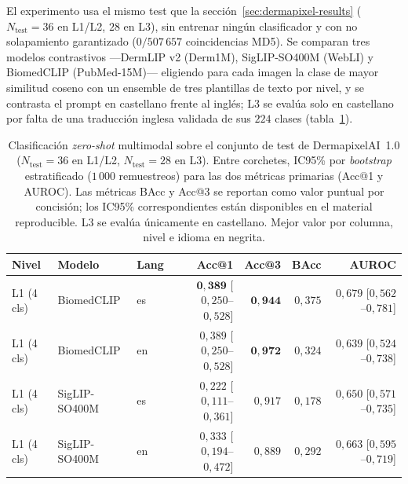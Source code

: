 El experimento usa el mismo test que la
sección~\ref{sec:dermapixel-results} ($N_{\mathrm{test}} = 36$ en
L1/L2, $28$ en L3), sin entrenar ningún clasificador y con no
solapamiento garantizado ($0 / 507\,657$ coincidencias MD5). Se
comparan tres modelos contrastivos ---DermLIP v2 (Derm1M),
SigLIP-SO400M (WebLI) y BiomedCLIP (PubMed-15M)--- eligiendo para cada
imagen la clase de mayor similitud coseno con un ensemble de
tres plantillas de texto por nivel, y se contrasta el prompt en
castellano frente al inglés; L3 se evalúa solo en castellano por falta
de una traducción inglesa validada de sus $224$ clases
(tabla~\ref{tab:dermapixel-zs}).

\begin{table}[htbp]
\centering
\footnotesize
\setlength{\tabcolsep}{4pt}
\renewcommand{\arraystretch}{0.95}
\caption{Clasificación \emph{zero-shot} multimodal sobre el
conjunto de test de DermapixelAI~1.0 ($N_{\mathrm{test}} = 36$ en
L1/L2, $N_{\mathrm{test}} = 28$ en L3). Entre corchetes, IC95\%
por \emph{bootstrap} estratificado ($1\,000$ remuestreos) para
las dos métricas primarias (Acc@1 y AUROC). Las métricas BAcc y
Acc@3 se reportan como valor puntual por concisión; los IC95\%
correspondientes están disponibles en el material reproducible.
L3 se evalúa únicamente en castellano. Mejor valor por columna,
nivel e idioma en negrita.}
\label{tab:dermapixel-zs}
\begin{tabular}{lllrrrr}
\hline
Nivel & Modelo & Lang & Acc@1 & Acc@3 & BAcc & AUROC \\
\hline
L1 (4 cls)   & BiomedCLIP    & es & $\mathbf{0{,}389}$ [$0{,}250$--$0{,}528$]
                                  & $\mathbf{0{,}944}$
                                  & $0{,}375$
                                  & $0{,}679$ [$0{,}562$--$0{,}781$] \\
L1 (4 cls)   & BiomedCLIP    & en & $0{,}389$ [$0{,}250$--$0{,}528$]
                                  & $\mathbf{0{,}972}$
                                  & $0{,}324$
                                  & $0{,}639$ [$0{,}524$--$0{,}738$] \\
L1 (4 cls)   & SigLIP-SO400M & es & $0{,}222$ [$0{,}111$--$0{,}361$]
                                  & $0{,}917$
                                  & $0{,}178$
                                  & $0{,}650$ [$0{,}571$--$0{,}735$] \\
L1 (4 cls)   & SigLIP-SO400M & en & $0{,}333$ [$0{,}194$--$0{,}472$]
                                  & $0{,}889$
                                  & $0{,}292$
                                  & $0{,}663$ [$0{,}595$--$0{,}719$] \\

\end{tabular}
\end{table}
